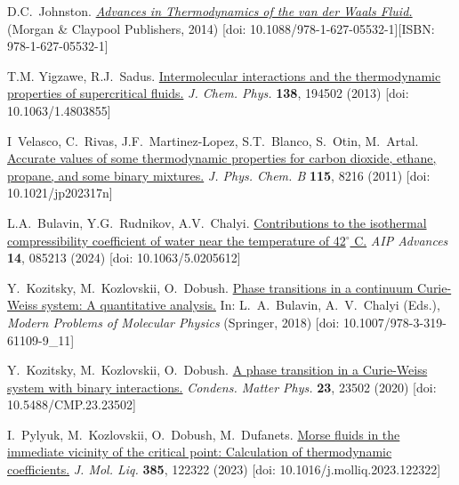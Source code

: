 \documentclass[fleqn,twoside,twocolumn,nofootinbib,showkeys]{revtex4} %
\begin{document}
	\begin{thebibliography}{9}
		
		 D.C.~Johnston.
		\textit{\href{https://dx.doi.org/10.1088/978-1-627-05532-1}{Advances in Thermodynamics of the van der {W}aals Fluid.}} (Morgan \& Claypool Publishers, 2014) [doi: 10.1088/978-1-627-05532-1][ISBN: 978-1-627-05532-1]
		
		 T.M. Yigzawe, R.J.~Sadus.
		\href{https://doi.org/10.1063/1.4803855}{Intermolecular interactions and the thermodynamic properties of supercritical fluids.} \textit{J. Chem. Phys.} \textbf{138}, 194502 (2013) [doi: 10.1063/1.4803855]
		
		 I~Velasco, C.~Rivas, J.F.~Martinez-Lopez, S.T.~Blanco, S.~Otin, M.~Artal.
		\href{https://pubs.acs.org/doi/abs/10.1021/jp202317n}{Accurate values of some thermodynamic properties for carbon dioxide, ethane, propane, and some binary mixtures.} \textit{J. Phys. Chem. B} \textbf{115}, 8216 (2011) [doi: 10.1021/jp202317n] 
		
		 L.A.~Bulavin, Y.G.~Rudnikov, A.V.~Chalyi.
		\href{https://pubs.aip.org/aip/adv/article/14/8/085213/3307287}{Contributions to the isothermal compressibility coefficient of water near the temperature of 42$^{\circ}$ C.} \textit{AIP Advances} \textbf{14}, 085213 (2024) [doi: 10.1063/5.0205612] 
		
		 Y.~Kozitsky, M.~Kozlovskii, O.~Dobush.
		\href{https://link.springer.com/chapter/10.1007/978-3-319-61109-9_11}{Phase transitions in a continuum Curie-Weiss system: A quantitative analysis.} In: L.~A.~Bulavin, A.~V.~Chalyi (Eds.), \textit{Modern Problems of Molecular Physics} (Springer, 2018) [doi: 10.1007/978-3-319-61109-9\_11]
		
		 Y.~Kozitsky, M.~Kozlovskii, O.~Dobush.
		\href{https://icmp.lviv.ua/journal/zbirnyk.102/23502/abstract.html}{A phase transition in a Curie-Weiss system with binary interactions.} \textit{Condens.
			Matter Phys.} \textbf{23}, 23502 (2020) [doi: 10.5488/CMP.23.23502]
		
			I.~Pylyuk, M.~Kozlovskii, O.~Dobush, M.~Dufanets.
		\href{https://www.sciencedirect.com/science/article/pii/S0167732223011261}{Morse fluids in the immediate vicinity of the critical point: Calculation of thermodynamic coefficients.} \textit{J. Mol. Liq.} \textbf{385}, 122322 (2023) [doi: 10.1016/j.molliq.2023.122322]
		

\end{thebibliography}
\end{document}
